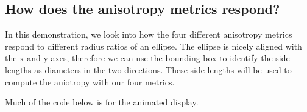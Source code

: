 \documentclass[letterpaper,10pt,english]{sphinxmanual}
\begin{document}
\begin{sphinxVerbatim}[commandchars=\\\{\}]
      
\end{sphinxVerbatim}


\subsection{How does the anisotropy metrics respond?}
\label{\detokenize{06-ShapeAnalysis:how-does-the-anisotropy-metrics-respond}}
\sphinxAtStartPar
In this demonstration, we look into how the four different anisotropy metrics respond to different radius ratios of an ellipse. The ellipse is nicely aligned with the x\sphinxhyphen{} and y\sphinxhyphen{} axes, therefore we can use the bounding box to identify the side lengths as diameters in the two directions. These side lengths will be used to compute the aniotropy with our four metrics.

\sphinxAtStartPar
Much of the code below is for the animated display.
\end{document}
